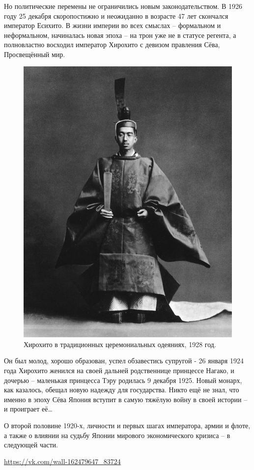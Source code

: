 Но политические перемены не ограничились новым законодательством. В 1926 году 25 декабря скоропостижно и неожиданно в возрасте 47 лет скончался император Есихито. В жизни империи во всех смыслах – формальном и неформальном, начиналась новая эпоха – на трон уже не в статусе регента, а полновластно восходил император Хирохито с девизом правления Сёва, Просвещённый мир. 

\begin{figure}[h!tb] 
	\centering\includegraphics[scale=0.3]{Glava7/PGo8ZLKXlk4.jpg}
	\caption{Хирохито в традиционных церемониальных одеяниях, 1928 год.}%
\end{figure}

Он был молод, хорошо образован, успел обзавестись супругой - 26 января 1924 года Хирохито женился на своей дальней родственнице принцессе Нагако, и дочерью – маленькая принцесса Тэру родилась 9 декабря 1925. Новый монарх, как казалось, обещал новую надежду для государства. Никто ещё не знал, что именно в эпоху Сёва Япония вступит в самую тяжёлую войну в своей истории – и проиграет её…

О второй половине 1920-х, личности и первых шагах императора, армии и флоте, а также о влиянии на судьбу Японии мирового экономического кризиса – в следующей части. 

\url{https://vk.com/wall-162479647_83724}